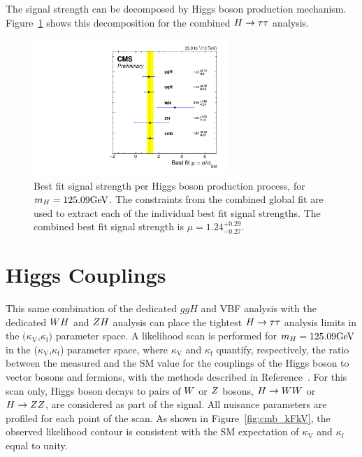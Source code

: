 The signal strength can be decomposed by Higgs boson production 
mechanism. Figure~\ref{fig:cmb_mu_higgs_processes} shows this decomposition for
the combined $H\to\tau\tau$ analysis. 

\begin{figure}[!ht]
 \begin{center}
  \includegraphics[width=0.65\textwidth]{higgs_to_taus_vh/plots/combined/mu_higgs_procs.pdf}
 \end{center}
 \caption{
 Best fit signal strength per Higgs boson production process, for $m_{H} = 125.09\mathrm{GeV}$.
 The constraints from the combined global fit are used to extract each of the 
 individual best fit signal strengths. The combined best fit signal strength 
 is $\mu = 1.24 ^{+0.29} _{-0.27}$.
 }
 \label{fig:cmb_mu_higgs_processes}
\end{figure}



\section{Higgs Couplings}
This same combination of the dedicated $ggH$ and VBF analysis with 
the dedicated $WH$ and $ZH$ analysis can place the tightest
$H\to\tau\tau$ analysis limits in the $(\kappa_\text{V}$,$\kappa_\text{f})$ parameter space.
A likelihood scan is performed for $m_{H}=125.09\mathrm{GeV}$ in the ($\kappa_\text{V}$,$\kappa_\text{f}$) 
parameter space, where $\kappa_\text{V}$ and $\kappa_\text{f}$ quantify, respectively, 
the ratio between the measured and the SM value for the couplings of the Higgs boson to 
vector bosons and fermions, with the methods described in Reference~\cite{Chatrchyan:2014nva}. 
For this scan only, Higgs boson decays to pairs of $W$ or $Z$ bosons, $H\to WW$ or $H\to ZZ$,
are considered as part of 
the signal. 
All nuisance 
parameters are profiled for each point of the scan. As shown in 
Figure~\ref{fig:cmb_kFkV}, the observed likelihood contour is consistent with the SM expectation 
of $\kappa_\text{V}$ and $\kappa_\text{f}$ equal to unity.

